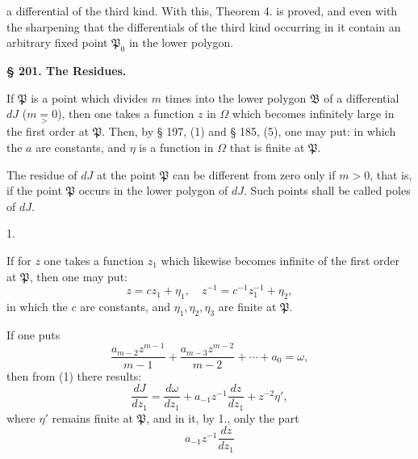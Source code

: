 a differential of the third kind. With this, Theorem 4. is proved, and even with the sharpening that the differentials of the third kind occurring in it contain an arbitrary fixed point $\mathfrak{P}_0$ in the lower polygon.

\begin{center}
\textbf{§ 201. The Residues.}
\end{center}

If $\mathfrak{P}$ is a point which divides $m$ times into the lower polygon $\mathfrak{B}$ of a differential $dJ$ ($m \mathrel{\underset{>}{=}} 0$),
then one takes a function $z$ in $\Omega$ which becomes infinitely large in the first order at $\mathfrak{P}$. Then, by § 197, (1) and § 185, (5), one may put:
in which the $a$ are constants, and $\eta$ is a function in $\Omega$ that is finite at $\mathfrak{P}$.


The residue of $dJ$ at the point $\mathfrak{P}$ can be different from zero only if $m>0$, that is, if the point $\mathfrak{P}$ occurs in the lower polygon of $dJ$. Such points shall be called poles of $dJ$.

1. 

If for $z$ one takes a function $z_1$ which likewise becomes infinite of the first order at $\mathfrak{P}$, then one may put:
\[
z = cz_1 + \eta_1, \quad z^{-1} = c^{-1}z_1^{-1} + \eta_2,
\]
in which the $c$ are constants, and $\eta_1, \eta_2, \eta_3$ are finite at $\mathfrak{P}$.

If one puts
\[
\frac{a_{m-2}z^{m-1}}{m-1} + \frac{a_{m-3}z^{m-2}}{m-2} + \cdots + a_0 = \omega,
\]
then from (1) there results:
\[
\frac{dJ}{dz_1} = \frac{d\omega}{dz_1} + a_{-1}z^{-1}\frac{dz}{dz_1} + z^{-2}\eta',
\]
where $\eta'$ remains finite at $\mathfrak{P}$, and in it, by 1., only the part
\[
a_{-1}z^{-1}\frac{dz}{dz_1}
\]
